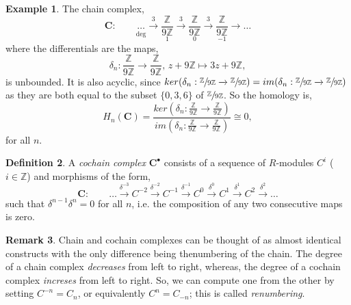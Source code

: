 \documentclass[11.5pt, twoside, a4paper, titlepage]{report}
\providecommand{\bb}[1]{\mathbb{#1}}
\theoremstyle{definition}
\newtheorem{mydef}{Definition}[section]
\newtheorem{rem}[mydef]{Remark}
\newtheorem{eg}[mydef]{Example}
\theoremstyle{plain}
\begin{document}
\begin{eg}
The chain complex,
\begin{equation*}
\mathbf{C}: \qquad \underset{\text{deg}}{\underset{}{\dots}} \xrightarrow{3}\underset{1}{\frac{\bb{Z}}{9\bb{Z}}} \xrightarrow{3}\underset{0}{\frac{\bb{Z}}{9\bb{Z}}} \xrightarrow{3}\underset{-1}{\frac{\bb{Z}}{9\bb{Z}}} \xrightarrow{} \dots
\end{equation*}
where the differentials are the maps,
\begin{equation*}
\delta_n:\frac{\bb{Z}}{9\bb{Z}}\xrightarrow{}\frac{\bb{Z}}{9\bb{Z}}\text{, } z+9\bb{Z}\mapsto 3z+9\bb{Z},
\end{equation*}
is unbounded. It is also acyclic, since $ker(\delta_n:\sfrac{\bb{Z}}{9\bb{Z}}\xrightarrow{}\sfrac{\bb{Z}}{9\bb{Z}})=im(\delta_n:\sfrac{\bb{Z}}{9\bb{Z}}\xrightarrow{}\sfrac{\bb{Z}}{9\bb{Z}})$  as they are both equal to the subset $\{0,3,6\}$ of $\sfrac{\bb{Z}}{9\bb{Z}}$.
So the homology is,
\begin{equation*}
H_n(\mathbf{C})=\frac{ker(\delta_n:\frac{\bb{Z}}{9\bb{Z}}\xrightarrow{}\frac{\bb{Z}}{9\bb{Z}})}{im(\delta_n:\frac{\bb{Z}}{9\bb{Z}}\xrightarrow{}\frac{\bb{Z}}{9\bb{Z}})} \cong 0, 
\end{equation*}
for all $n$.
\end{eg}

\begin{mydef}
A \emph{cochain complex} $\mathbf{C}^{\bullet}$ consists of a sequence of $R$-modules $C^i$ ($i \in \mathbb{Z}$) and morphisms of the form,
\begin{equation*}
\mathbf{C}: \qquad \dots \xrightarrow{\delta^{-3}} C^{-2} \xrightarrow{\delta^{-2}} C^{-1} \xrightarrow{\delta^{-1 }} C^0 \xrightarrow{\delta^0} C^{1} \xrightarrow{\delta^{1}} C^{2} \xrightarrow{\delta^{2}} \dots
\end{equation*}
such that $\delta^{n-1}\delta^{n}=0$ for all $n$, i.e. the composition of any two consecutive maps is zero.
\end{mydef}

\begin{rem}
Chain and cochain complexes can be thought of as almost identical constructs with the only difference being thenumbering of the chain. The degree of a chain complex \emph{decreases} from left to right, whereas, the degree of a cochain complex \emph{increses} from left to right. So, we can compute one from the other by setting $C^{-n}=C_n$, or equivalently $C^n=C_{-n}$; this is called \emph{renumbering}.
\end{rem}
\end{document}
